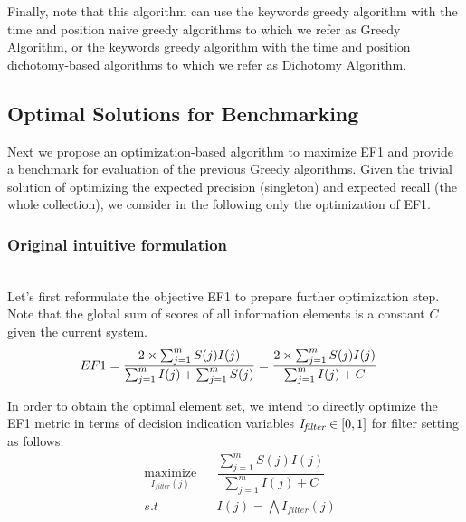 Finally, note that this algorithm can use the keywords greedy algorithm with the time and position naive greedy algorithms to which we refer as Greedy Algorithm, or the keywords greedy algorithm with the time and position dichotomy-based algorithms to which we refer as Dichotomy Algorithm.



\subsection{Optimal Solutions for Benchmarking}

Next we propose an optimization-based algorithm to maximize EF1 and provide a benchmark for evaluation of the previous Greedy algorithms.  Given the trivial solution of optimizing the expected precision (singleton) and expected recall (the whole collection), we consider in the following only the optimization of EF1.  

\subsubsection{Original intuitive formulation} \hfill \\
Let's first reformulate the objective EF1 to prepare further optimization step. Note that the global sum of scores of all information elements is a constant $C$ given the current system.
\begin{equation}
\begin{aligned}
    \emph{$EF1$} &= \dfrac{2\times \sum_{j=1}^m S(j)I(j)}{\sum_{j=1}^m I(j) + \sum_{j=1}^m S(j)} = \dfrac{2 \times \sum_{j=1}^m S(j)I(j)}{\sum_{j=1}^m I(j) + C}
\end{aligned}
\end{equation}

In order to obtain the optimal element set, we intend to directly optimize the EF1 metric in terms of decision indication variables $\emph{I\textsubscript{filter}} \in \left[0, 1\right]$ for filter setting as follows:
\begin{equation}
\begin{aligned}
& \underset{I_{\mathit{filter}}(j)}{\text{maximize}}
& & \dfrac{\sum_{j=1}^m S(j)I(j)}{\sum_{j=1}^m I(j) + C} \\
& s.t
& & I(j) = \bigwedge I_{\mathit{filter}}(j) \\
\end{aligned}
\end{equation}

